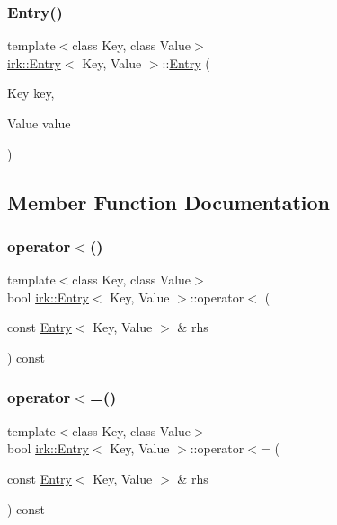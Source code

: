 \subsubsection{\texorpdfstring{Entry()}{Entry()}\hspace{0.1cm}{\footnotesize\ttfamily [2/2]}}
{\footnotesize\ttfamily template$<$class Key, class Value$>$ \\
\mbox{\hyperlink{structirk_1_1Entry}{irk\+::\+Entry}}$<$ Key, Value $>$\+::\mbox{\hyperlink{structirk_1_1Entry}{Entry}} (\begin{DoxyParamCaption}\item[{Key}]{key,  }\item[{Value}]{value }\end{DoxyParamCaption})\hspace{0.3cm}{\ttfamily [inline]}}



\subsection{Member Function Documentation}
\mbox{\label{structirk_1_1Entry_a51a009e127da74080b304a70f629aebe}} 
\subsubsection{\texorpdfstring{operator$<$()}{operator<()}}
{\footnotesize\ttfamily template$<$class Key, class Value$>$ \\
bool \mbox{\hyperlink{structirk_1_1Entry}{irk\+::\+Entry}}$<$ Key, Value $>$\+::operator$<$ (\begin{DoxyParamCaption}\item[{const \mbox{\hyperlink{structirk_1_1Entry}{Entry}}$<$ Key, Value $>$ \&}]{rhs }\end{DoxyParamCaption}) const\hspace{0.3cm}{\ttfamily [inline]}}

\mbox{\label{structirk_1_1Entry_a0854fbab2a9e88753432a8b8c7d91997}} 
\subsubsection{\texorpdfstring{operator$<$=()}{operator<=()}}
{\footnotesize\ttfamily template$<$class Key, class Value$>$ \\
bool \mbox{\hyperlink{structirk_1_1Entry}{irk\+::\+Entry}}$<$ Key, Value $>$\+::operator$<$= (\begin{DoxyParamCaption}\item[{const \mbox{\hyperlink{structirk_1_1Entry}{Entry}}$<$ Key, Value $>$ \&}]{rhs }\end{DoxyParamCaption}) const\hspace{0.3cm}{\ttfamily [inline]}}


